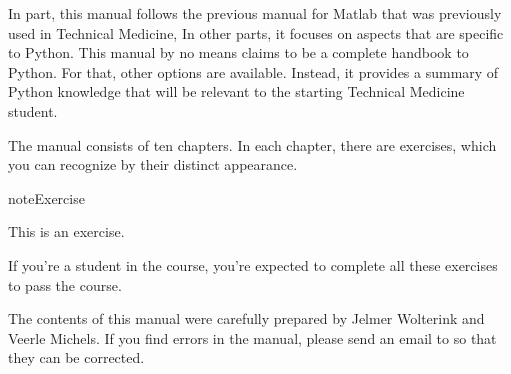 \documentclass[letterpaper,10pt,english]{jupyterBook}
\begin{document}
\sphinxAtStartPar
In part, this manual follows the previous manual for Matlab that was previously used in Technical Medicine, In other parts, it focuses on aspects that are specific to Python. This manual by no means claims to be a complete handbook to Python. For that, other options are available. Instead, it provides a summary of Python knowledge that will be relevant to the starting Technical Medicine student.

\sphinxAtStartPar
The manual consists of ten chapters. In each chapter, there are exercises, which you can recognize by their distinct appearance.

\begin{sphinxadmonition}{note}{Exercise}

\sphinxAtStartPar
This is an exercise.
\end{sphinxadmonition}

\sphinxAtStartPar
If you’re a student in the  course, you’re expected to complete all these exercises to pass the course.

\sphinxAtStartPar
The contents of this manual were carefully prepared by Jelmer Wolterink and Veerle Michels. If you find errors in the manual, please send an e\sphinxhyphen{}mail to  so that they can be corrected.

\sphinxstepscope
\end{document}
